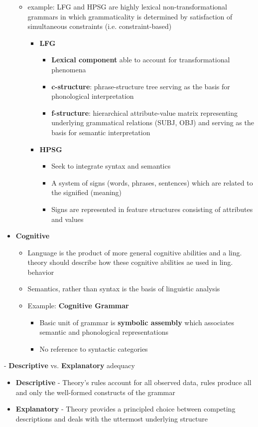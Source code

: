 \documentclass[11pt]{article}
\begin{document}
\begin{itemize}
\begin{itemize}
   \item example: LFG and HPSG are highly lexical non-transformational grammars in which grammaticality is determined by satisfaction of simultaneous constraints (i.e. constraint-based)
    \begin{itemize}
     \item {\bf LFG}
      \begin{itemize}
       \item {\bf Lexical component} able to account for transformational phenomena
       \item {\bf c-structure}: phrase-structure tree serving as the basis for phonological interpretation
       \item {\bf f-structure}: hierarchical attribute-value matrix representing underlying grammatical relations (SUBJ, OBJ) and serving as the basis for semantic interpretation
      \end{itemize}
     \item {\bf HPSG}
      \begin{itemize}
       \item Seek to integrate syntax and semantics
       \item A system of signs (words, phrases, sentences) which are related to the signified (meaning)
       \item Signs are represented in feature structures consisting of attributes and values
      \end{itemize}
    \end{itemize}
  \end{itemize}
 \item {\bf Cognitive} 
  \begin{itemize}
   \item Language is the product of more general cognitive abilities and a ling. theory should describe how these cognitive abilities ae used in ling. behavior
   \item Semantics, rather than syntax is the basis of linguistic analysis
   \item Example: {\bf Cognitive Grammar}
    \begin{itemize}
      \item Basic unit of grammar is {\bf symbolic assembly} which associates semantic and phonological representations
      \item No reference to syntactic categories
    \end{itemize}
  \end{itemize}
\end{itemize}
- {\bf Descriptive} vs. {\bf Explanatory} adequacy
\begin{itemize}
 \item {\bf Descriptive} - Theory's rules account for all observed data, rules produce all and only the well-formed constructs of the grammar
 \item {\bf Explanatory} - Theory provides a principled choice between competing descriptions and deals with the uttermost underlying structure
\end{itemize}
\end{document}

